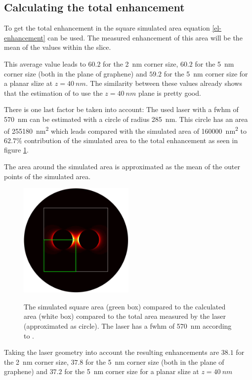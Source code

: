 \subsection{Calculating the total enhancement}
To get the total enhancement in the square simulated area equation \ref{el-enhancement} can be used. The measured enhancement of this area will be the mean of the values within the slice.

This average value leads to $60.2$ for the \SI{2}{nm} corner size, $60.2$ for the \SI{5}{nm} corner size (both in the plane of graphene) and $59.2$ for the \SI{5}{nm} corner size for a planar slize at $z=\SI{40}{nm}$. The similarity between these values already shows that the estimation of \cite{heeg} to use the $z=\SI{40}{nm}$ plane is pretty good.

There is one last factor be taken into account: The used laser with a fwhm of \SI{570}{nm} can be estimated with a circle of radius \SI{285}{nm}. This circle has an area of \SI{255 180}{nm^2} which leads compared with the simulated area of \SI{160 000}{nm^2} to $62.7\%$ contribution of the simulated area to the total enhancement as seen in figure \ref{symmetry}.

The area around the simulated area is approximated as the mean of the outer points of the simulated area.

\begin{figure}[!h]
  \centering
  \includegraphics[width=0.5\textwidth]{./images/fwhm-chart.jpg}
  \label{symmetry}
  \caption{The simulated square area (green box) compared to the calculated area (white box) compared to the total area measured by the laser (approximated as circle). The laser has a fwhm of \SI{570}{nm} according to \cite{heeg}.}
\end{figure}

Taking the laser geometry into account the resulting enhancements are $38.1$ for the \SI{2}{nm} corner size, $37.8$ for the \SI{5}{nm} corner size (both in the plane of graphene) and $37.2$ for the \SI{5}{nm} corner size for a planar slize at $z=\SI{40}{nm}$
\newpage
\null
\newpage
